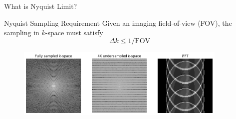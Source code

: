 \begin{frame}{What is Nyquist Limit?}
	
	\begin{block}{Nyquist Sampling Requirement}
		{\large
		Given an imaging field-of-view (FOV), the sampling in $k$-space must satisfy
		\begin{equation}
			\Delta k \leq 1/\mathrm{FOV}
		\end{equation}}
	\end{block}
	
	\begin{figure}
		\includegraphics[width=0.9\textwidth]{fig/Nyquist.png}
	\end{figure}
	
\end{frame}


